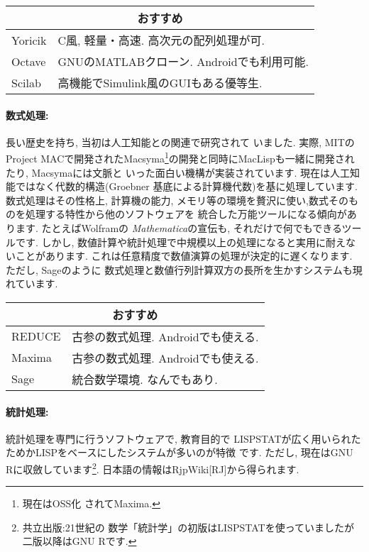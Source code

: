 \vspace{0.5cm}
{\footnotesize
\begin{tabularx}{7cm}{l X}
\multicolumn{2}{c}{おすすめ}\\\hline
Yoricik& C風, 軽量・高速. 高次元の配列処理が可.\\
Octave& GNUのMATLABクローン. Androidでも利用可能.\\
Scilab& 高機能でSimulink風のGUIもある優等生.\\\hline
\end{tabularx}
}
\vspace{0.5cm}

\paragraph{数式処理:} 長い歴史を持ち, 当初は人工知能との関連で研究されて
いました. 実際, MITのProject MACで開発されたMacsyma\footnote{現在はOSS化
されてMaxima.}の開発と同時にMacLispも一緒に開発されたり, Macsymaには文脈と
いった面白い機構が実装されています. 現在は人工知能ではなく代数的構造(Groebner
基底による計算機代数)を基に処理しています. 数式処理はその性格上, 計算機の能力,
 メモリ等の環境を贅沢に使い,数式そのものを処理する特性から他のソフトウェアを
統合した万能ツールになる傾向があります. たとえばWolframの
\textit{Mathematica}の宣伝も, それだけで何でもできるツールです. しかし,
 数値計算や統計処理で中規模以上の処理になると実用に耐えないことがあります.
 これは任意精度で数値演算の処理が決定的に遅くなります. ただし, Sageのように
数式処理と数値行列計算双方の長所を生かすシステムも現れています.

\vspace{0.5cm}
{\footnotesize
\begin{tabularx}{7cm}{l X}
\multicolumn{2}{c}{おすすめ}\\\hline
REDUCE& 古参の数式処理. Androidでも使える.\\
Maxima& 古参の数式処理. Androidでも使える.\\
Sage&   統合数学環境. なんでもあり.\\\hline
\end{tabularx}
}
\vspace{0.5cm}

\paragraph{統計処理:} 統計処理を専門に行うソフトウェアで, 教育目的で
LISPSTATが広く用いられたためかLISPをベースにしたシステムが多いのが特徴
です. ただし, 現在はGNU Rに収斂しています\footnote{共立出版:21世紀の
数学「統計学」の初版はLISPSTATを使っていましたが二版以降はGNU Rです.}.
 日本語の情報はRjpWiki[RJ]から得られます.

